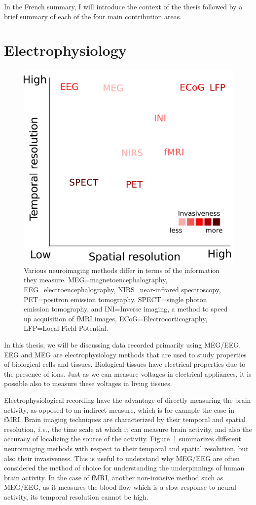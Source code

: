 In the French summary, I will introduce the context of the thesis followed by a brief summary of each of the four main contribution areas.

\section*{Electrophysiology}

\begin{figure}[htb]
\begin{center}
   \includegraphics[width=0.6\linewidth]{figures/neuroimaging_methods.pdf}
\end{center}
   \caption[]{Various neuroimaging methods differ in terms of the information they measure. MEG=magnetoencephalography, EEG=electroencephalography, NIRS=near-infrared spectroscopy, PET=positron emission tomography, SPECT=single photon emission tomography, and INI=Inverse imaging, a method to speed up acquisition of fMRI images, ECoG=Electrocorticography, LFP=Local Field Potential.}
   \label{fig:sommaire:neuroimaging_methods}
\end{figure}

In this thesis, we will be discussing data recorded primarily using \ac{MEG}/\ac{EEG}. EEG and MEG are electrophysiology methods that are used to study properties of biological cells and tissues. 
Biological tissues have electrical properties due to the presence of ions. Just as we can measure voltages in electrical appliances, it is possible also to measure these voltages in living tissues. 

Electrophysiological recording have the advantage of directly measuring the brain activity, as opposed to an indirect measure, which is for example the case in \ac{fMRI}.
Brain imaging techniques are characterized by their temporal and spatial resolution, \textit{i.e.,} the time scale at which it can measure brain activity, and also the accuracy of localizing the source of the activity. Figure~\ref{fig:sommaire:neuroimaging_methods} summarizes different neuroimaging methods with respect to their temporal and spatial resolution, but also their invasiveness. This is useful to understand why MEG/EEG are often considered the method of choice for understanding the underpinnings of human brain activity. In the case of \ac{fMRI}, another non-invasive method such as MEG/EEG, as it measures the blood flow which is a slow response to neural activity, its temporal resolution cannot be high. 

